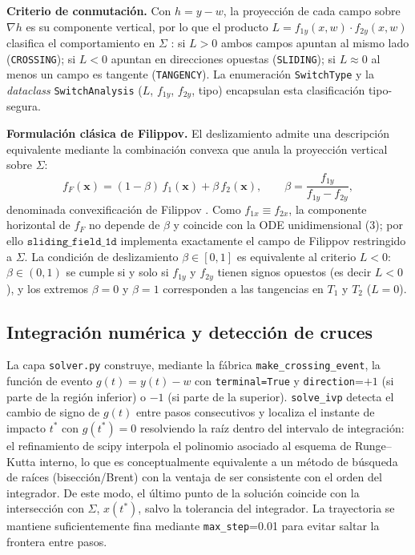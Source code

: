 \documentclass[12pt,letterpaper]{article}
\begin{document}
\textbf{Criterio de conmutación.} Con $h = y - w$, la proyección de cada campo sobre $\nabla h$ es su componente vertical, por lo que el producto $L = f_{1y}(x,w)\cdot f_{2y}(x,w)$ clasifica el comportamiento en $\Sigma$ \cite{piiroinen2008event}: si $L>0$ ambos campos apuntan al mismo lado (\texttt{CROSSING}); si $L<0$ apuntan en direcciones opuestas (\texttt{SLIDING}); si $L\approx 0$ al menos un campo es tangente (\texttt{TANGENCY}). La enumeración \texttt{SwitchType} y la \emph{dataclass} \texttt{SwitchAnalysis} ($L$, $f_{1y}$, $f_{2y}$, tipo) encapsulan esta clasificación tipo-segura.

\textbf{Formulación clásica de Filippov.} El deslizamiento admite una descripción equivalente mediante la combinación convexa que anula la proyección vertical sobre $\Sigma$:
\begin{equation}
f_F(\mathbf{x}) = (1-\beta)\, f_1(\mathbf{x}) + \beta\, f_2(\mathbf{x}), \qquad
\beta = \frac{f_{1y}}{f_{1y} - f_{2y}} ,
\end{equation}
denominada convexificación de Filippov \cite{filippov1988}. Como $f_{1x}\equiv f_{2x}$, la componente horizontal de $f_F$ no depende de $\beta$ y coincide con la ODE unidimensional (3); por ello $\texttt{sliding\_field\_1d}$ implementa exactamente el campo de Filippov restringido a $\Sigma$. La condición de deslizamiento $\beta\in[0,1]$ es equivalente al criterio $L<0$: $\beta\in(0,1)$ se cumple si y solo si $f_{1y}$ y $f_{2y}$ tienen signos opuestos (es decir $L<0$), y los extremos $\beta=0$ y $\beta=1$ corresponden a las tangencias en $T_1$ y $T_2$ ($L=0$).

\subsection{Integración numérica y detección de cruces}
La capa \texttt{solver.py} construye, mediante la fábrica \texttt{make\_crossing\_event}, la función de evento $g(t) = y(t) - w$ con \texttt{terminal=True} y \texttt{direction}=$+1$ (si parte de la región inferior) o $-1$ (si parte de la superior). \texttt{solve\_ivp} detecta el cambio de signo de $g(t)$ entre pasos consecutivos y localiza el instante de impacto $t^*$ con $g(t^*)=0$ resolviendo la raíz dentro del intervalo de integración: el refinamiento de scipy interpola el polinomio asociado al esquema de Runge--Kutta interno, lo que es conceptualmente equivalente a un método de búsqueda de raíces (bisección/Brent) con la ventaja de ser consistente con el orden del integrador. De este modo, el último punto de la solución coincide con la intersección con $\Sigma$, $x(t^*)$, salvo la tolerancia del integrador. La trayectoria se mantiene suficientemente fina mediante \texttt{max\_step}=0.01 para evitar saltar la frontera entre pasos.
\end{document}
